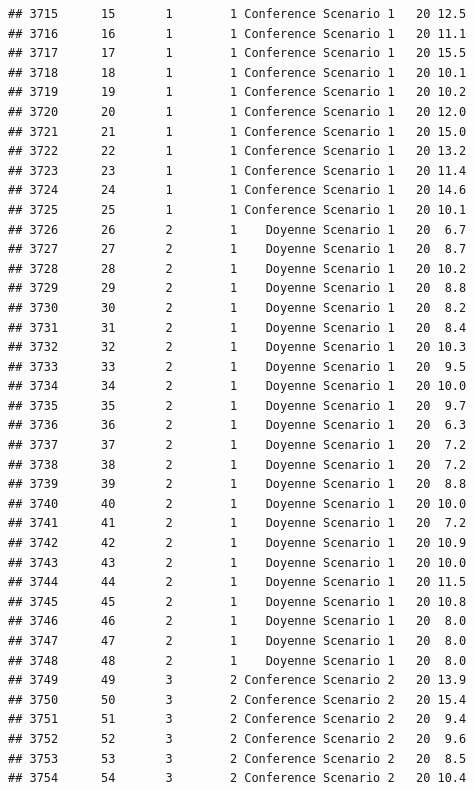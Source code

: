 \documentclass[
]{article}
\begin{document}
\begin{verbatim}
## 3715      15       1        1 Conference Scenario 1   20 12.5
## 3716      16       1        1 Conference Scenario 1   20 11.1
## 3717      17       1        1 Conference Scenario 1   20 15.5
## 3718      18       1        1 Conference Scenario 1   20 10.1
## 3719      19       1        1 Conference Scenario 1   20 10.2
## 3720      20       1        1 Conference Scenario 1   20 12.0
## 3721      21       1        1 Conference Scenario 1   20 15.0
## 3722      22       1        1 Conference Scenario 1   20 13.2
## 3723      23       1        1 Conference Scenario 1   20 11.4
## 3724      24       1        1 Conference Scenario 1   20 14.6
## 3725      25       1        1 Conference Scenario 1   20 10.1
## 3726      26       2        1    Doyenne Scenario 1   20  6.7
## 3727      27       2        1    Doyenne Scenario 1   20  8.7
## 3728      28       2        1    Doyenne Scenario 1   20 10.2
## 3729      29       2        1    Doyenne Scenario 1   20  8.8
## 3730      30       2        1    Doyenne Scenario 1   20  8.2
## 3731      31       2        1    Doyenne Scenario 1   20  8.4
## 3732      32       2        1    Doyenne Scenario 1   20 10.3
## 3733      33       2        1    Doyenne Scenario 1   20  9.5
## 3734      34       2        1    Doyenne Scenario 1   20 10.0
## 3735      35       2        1    Doyenne Scenario 1   20  9.7
## 3736      36       2        1    Doyenne Scenario 1   20  6.3
## 3737      37       2        1    Doyenne Scenario 1   20  7.2
## 3738      38       2        1    Doyenne Scenario 1   20  7.2
## 3739      39       2        1    Doyenne Scenario 1   20  8.8
## 3740      40       2        1    Doyenne Scenario 1   20 10.0
## 3741      41       2        1    Doyenne Scenario 1   20  7.2
## 3742      42       2        1    Doyenne Scenario 1   20 10.9
## 3743      43       2        1    Doyenne Scenario 1   20 10.0
## 3744      44       2        1    Doyenne Scenario 1   20 11.5
## 3745      45       2        1    Doyenne Scenario 1   20 10.8
## 3746      46       2        1    Doyenne Scenario 1   20  8.0
## 3747      47       2        1    Doyenne Scenario 1   20  8.0
## 3748      48       2        1    Doyenne Scenario 1   20  8.0
## 3749      49       3        2 Conference Scenario 2   20 13.9
## 3750      50       3        2 Conference Scenario 2   20 15.4
## 3751      51       3        2 Conference Scenario 2   20  9.4
## 3752      52       3        2 Conference Scenario 2   20  9.6
## 3753      53       3        2 Conference Scenario 2   20  8.5
## 3754      54       3        2 Conference Scenario 2   20 10.4

\end{verbatim}
\end{document}
